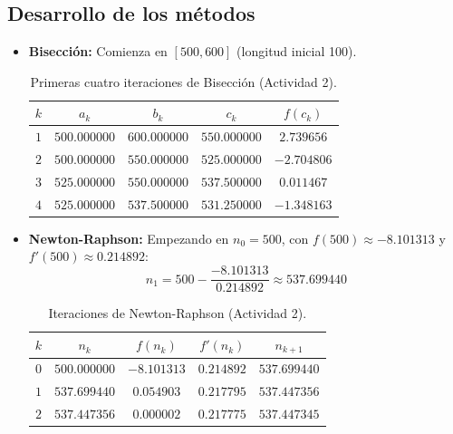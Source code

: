 \documentclass[11pt,a4paper]{article}
\begin{document}
\subsection{Desarrollo de los métodos}
\begin{itemize}[leftmargin=*]
    \item \textbf{Bisección:} Comienza en $[500, 600]$ (longitud inicial 100).
    \begin{table}[h!]
        \centering
        \caption{Primeras cuatro iteraciones de Bisección (Actividad 2).}
        \begin{tabular}{ccccc}
            \toprule
            $k$ & $a_k$ & $b_k$ & $c_k$ & $f(c_k)$ \\
            \midrule
            $1$ & $500.000000$ & $600.000000$ & $550.000000$ & $2.739656$ \\
            $2$ & $500.000000$ & $550.000000$ & $525.000000$ & $-2.704806$ \\
            $3$ & $525.000000$ & $550.000000$ & $537.500000$ & $0.011467$ \\
            $4$ & $525.000000$ & $537.500000$ & $531.250000$ & $-1.348163$ \\
            \bottomrule
        \end{tabular}
    \end{table}

    \item \textbf{Newton-Raphson:} Empezando en $n_0 = 500$, con $f(500) \approx -8.101313$ y $f'(500) \approx 0.214892$:
    \begin{equation}
        n_1 = 500 - \frac{-8.101313}{0.214892} \approx 537.699440
    \end{equation}
    \begin{table}[h!]
        \centering
        \caption{Iteraciones de Newton-Raphson (Actividad 2).}
        \begin{tabular}{ccccc}
            \toprule
            $k$ & $n_k$ & $f(n_k)$ & $f'(n_k)$ & $n_{k+1}$ \\
            \midrule
            $0$ & $500.000000$ & $-8.101313$ & $0.214892$ & $537.699440$ \\
            $1$ & $537.699440$ & $0.054903$ & $0.217795$ & $537.447356$ \\
            $2$ & $537.447356$ & $0.000002$ & $0.217775$ & $537.447345$ \\
            \bottomrule
        \end{tabular}
    \end{table}


\end{itemize}
\end{document}
